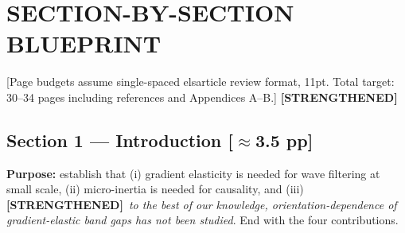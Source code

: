 \documentclass[11pt,a4paper]{article}
\newcommand{\bp}[1]{\textcolor{accent}{\textsf{\footnotesize [#1]}}}
\newcommand{\STR}{{\color{strcol}\textbf{[STRENGTHENED]}}}
\begin{document}
\newpage
\section{SECTION-BY-SECTION BLUEPRINT}

\bp{Page budgets assume single-spaced elsarticle review format, 11pt.
Total target: 30--34 pages including references and Appendices A--B.} \STR

\subsection{Section 1 --- Introduction \bp{$\approx$3.5 pp}}

\textbf{Purpose:} establish that (i) gradient elasticity is needed for wave filtering at
small scale, (ii) micro-inertia is needed for causality, and (iii) \STR\ \emph{to the best of our knowledge, orientation-dependence of gradient-elastic band gaps has not been studied}. End with the four contributions.
\end{document}
